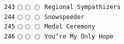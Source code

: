 \documentclass[a4paper,landscape]{article}
\begin{document}
\begin{multicols*}{5}
\texttt{243} \(\bigcirc\!\bigcirc\!\bigcirc\)  \texttt{Regional Sympathizers} \vspace{-0.3mm}\\ 
\texttt{244} \(\bigcirc\!\bigcirc\!\bigcirc\)  \texttt{Snowspeeder} \vspace{-0.3mm}\\ 
\texttt{245} \(\bigcirc\!\bigcirc\!\bigcirc\)  \texttt{Medal Ceremony} \vspace{-0.3mm}\\ 
\texttt{246} \(\bigcirc\!\bigcirc\!\bigcirc\)  \texttt{You're My Only Hope} \vspace{-0.3mm}\\ 

\end{multicols*}
\end{document}
